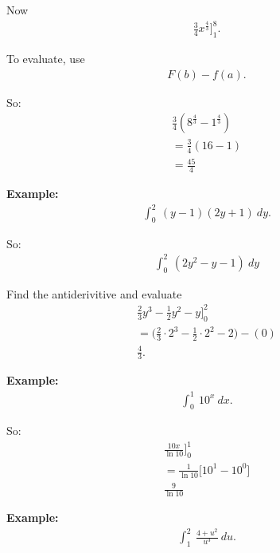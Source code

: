 \documentclass{report}
\begin{document}
\bigbreak \noindent \bigbreak \noindent
Now 
\begin{align*}
\frac{3}{4}x^{\frac{4}{3}}\bigg]_{1}^{8}
.\end{align*}

\bigbreak \noindent \bigbreak \noindent
To evaluate, use 
\begin{align*}
  F(b) - f(a)
.\end{align*}

\bigbreak \noindent
So:
\begin{align*}
  \frac{3}{4}(8^{\frac{4}{3}} - 1^{\frac{4}{3}}) \\
  = \frac{3}{4}(16 - 1) \\
  \boxed{=\frac{45}{4}}
\end{align*}

\bigbreak \noindent 
\begin{mdframed}
  \textbf{Example: }
  \begin{align*}
    \int_{0}^{2}\ (y-1)(2y+1)\ dy
  .\end{align*} 
\end{mdframed}

\bigbreak \noindent
So:
\begin{align*}
  \int_{0}^{2}\ (2y^{2}-y-1)\ dy
\end{align*}

\bigbreak \noindent \bigbreak \noindent
Find the antiderivitive and evaluate 
\begin{align*}
\frac{2}{3}y^{3} - \frac{1}{2}y^{2} - y\bigg]_{0}^{2} \\
= \bigg(\frac{2}{3} \cdot 2^{3} -\frac{1}{2} \cdot 2^{2} - 2\bigg) - ( 0) \\
\boxed{\frac{4}{3}}
.\end{align*}

\pagebreak \bigbreak \noindent
\bigbreak \noindent 
\begin{mdframed}
  \textbf{Example: }
  \begin{align*}
    \int_{0}^{1}\ 10^{x}\ dx
  .\end{align*}
\end{mdframed}

\bigbreak \noindent
So:
\begin{align*}
\frac{10x}{\ln{10}}\bigg]_{0}^{1} \\
= \frac{1}{\ln{10}}\bigg[10^{1} - 10^{0}\bigg] \\
\boxed{\frac{9}{\ln{10}}}
\end{align*}

\bigbreak \noindent 
\begin{mdframed}
  \textbf{Example: }
  \begin{align*}
    \int_{1}^{2}\ \frac{4+u^{2}}{u^{3}}\ du
  .\end{align*}
\end{mdframed}
\end{document}
